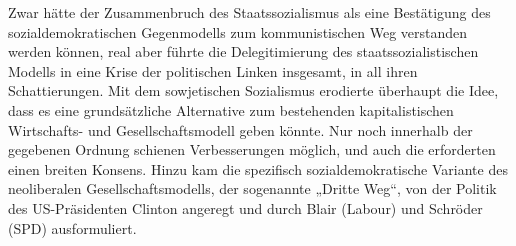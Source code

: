 \begin{multicols*}{2}
    Zwar hätte der Zusammenbruch des Staatssozialismus als eine Bestätigung des sozialdemokratischen Gegenmodells zum kommunistischen Weg verstanden werden können, real aber führte die Delegitimierung des staatssozialistischen Modells in eine Krise der politischen Linken insgesamt, in all ihren Schattierungen. Mit dem sowjetischen Sozialismus erodierte überhaupt die Idee, dass es eine grundsätzliche Alternative zum bestehenden kapitalistischen Wirtschafts- und Gesellschaftsmodell geben könnte. Nur noch innerhalb der gegebenen Ordnung schienen Verbesserungen möglich, und auch die erforderten einen breiten Konsens. Hinzu kam die spezifisch sozialdemokratische Variante des neoliberalen Gesellschaftsmodells, der sogenannte „Dritte Weg“, von der Politik des US-Präsidenten Clinton angeregt und durch Blair (Labour) und Schröder (SPD) ausformuliert.


\end{multicols*}
